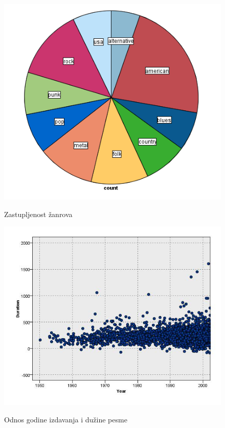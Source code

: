 \begin{figure}[H]
    \centering
    \includegraphics[scale=0.5]{resources/ZastupljenostZanrova.png}
    \label{fig:ZastupljenostZanrova}
    \caption{Zastupljenost \v{z}anrova}
\end{figure}

\begin{figure}[H]
    \centering
    \includegraphics[scale=0.4]{resources/year-duration.jpg}
    \label{fig:YearDuration}
    \caption{Odnos godine izdavanja i du\v{z}ine pesme}
\end{figure}

